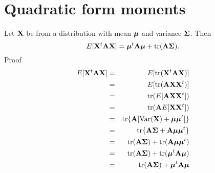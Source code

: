 \section{Quadratic form moments}
\label{sec:qfm}
Let $\bX$ be from a distribution with mean $\bmu$ and variance
$\bSigma$. Then 
$$
E[\bX^t \bA \bX] = \bmu^t \bA \bmu + \mbox{tr}(\bA \bSigma).
$$
Proof
\begin{eqnarray*}
E[\bX^t \bA \bX] & = & E[\mbox{tr}(\bX^t \bA \bX)]\\
& = & E[\mbox{tr}(\bA \bX \bX^t )]\\
& = &  \mbox{tr}(E[\bA  \bX \bX^t])\\
& = & \mbox{tr}(\bA E[\bX \bX^t])\\
& = & \mbox{tr}\{\bA [\Var(\bX) + \bmu \bmu^t]\}\\
& = & \mbox{tr}\{\bA\bSigma + \bA \bmu \bmu^t\}\\
& = & \mbox{tr}(\bA\bSigma) + \mbox{tr}(\bA \bmu \bmu^t)\\
& = & \mbox{tr}(\bA\bSigma) + \mbox{tr}(\bmu^t \bA \bmu )\\
& = & \mbox{tr}(\bA\bSigma) + \bmu^t \bA \bmu \\
\end{eqnarray*}